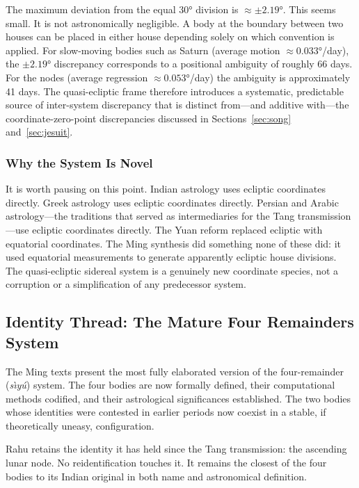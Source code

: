 \documentclass[10pt,a4paper]{article}
\providecommand{\degree}{\ensuremath{°}}
\begin{document}
The maximum deviation from the equal $30\degree$ division is
$\approx \pm 2.19\degree$.  This seems small.  It is not
astronomically negligible.  A body at the boundary between two houses
can be placed in either house depending solely on which convention is
applied.  For slow-moving bodies such as Saturn (average motion
$\approx 0.033\degree$/day), the $\pm 2.19\degree$ discrepancy
corresponds to a positional ambiguity of roughly 66 days.  For the
nodes (average regression $\approx 0.053\degree$/day) the ambiguity
is approximately 41 days.  The quasi-ecliptic frame therefore
introduces a systematic, predictable source of inter-system
discrepancy that is distinct from---and additive with---the
coordinate-zero-point discrepancies discussed in
Sections~\ref{sec:song} and~\ref{sec:jesuit}.

\subsubsection*{Why the System Is Novel}

It is worth pausing on this point.  Indian astrology uses ecliptic
coordinates directly.  Greek astrology uses ecliptic coordinates
directly.  Persian and Arabic astrology---the traditions that served
as intermediaries for the Tang transmission---use ecliptic
coordinates directly.  The Yuan reform replaced ecliptic with
equatorial coordinates.  The Ming synthesis did something none of
these did: it used equatorial measurements to generate apparently
ecliptic house divisions.  The quasi-ecliptic sidereal system is a genuinely new
coordinate species, not a corruption or a simplification of any
predecessor system.

\subsection*{Identity Thread: The Mature Four Remainders System}

The Ming texts present the most fully elaborated version of the
four-remainder (\textit{s\`{\i}y\'u}) system.  The four bodies are now formally
defined, their computational methods codified, and their astrological
significances established.  The two bodies whose identities were
contested in earlier periods now coexist in a stable, if
theoretically uneasy, configuration.

Rahu retains the identity it has held since
the Tang transmission: the ascending lunar node.  No reidentification
touches it.  It remains the closest of the four bodies to its Indian
original in both name and astronomical definition.
\end{document}
